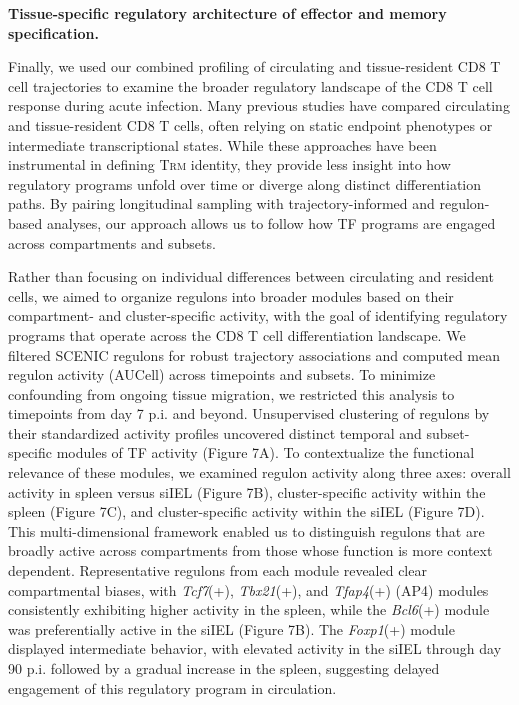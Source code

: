 \textbf{Tissue-specific regulatory architecture of effector and memory
specification.}

Finally, we used our combined profiling of circulating and
tissue-resident CD8 T cell trajectories to examine the broader
regulatory landscape of the CD8 T cell response during acute infection.
Many previous studies have compared circulating and tissue-resident CD8
T cells, often relying on static endpoint phenotypes or intermediate
transcriptional states. While these approaches have been instrumental in
defining T\textsc{rm} identity, they provide less insight into how
regulatory programs unfold over time or diverge along distinct
differentiation paths. By pairing longitudinal sampling with
trajectory-informed and regulon-based analyses, our approach allows us
to follow how TF programs are engaged across compartments and subsets.

Rather than focusing on individual differences between circulating and
resident cells, we aimed to organize regulons into broader modules based
on their compartment- and cluster-specific activity, with the goal of
identifying regulatory programs that operate across the CD8 T cell
differentiation landscape. We filtered SCENIC regulons for robust
trajectory associations and computed mean regulon activity (AUCell)
across timepoints and subsets. To minimize confounding from ongoing
tissue migration, we restricted this analysis to timepoints from day 7
p.i. and beyond. Unsupervised clustering of regulons by their
standardized activity profiles uncovered distinct temporal and
subset-specific modules of TF activity (Figure 7A). To contextualize the
functional relevance of these modules, we examined regulon activity
along three axes: overall activity in spleen versus siIEL (Figure 7B),
cluster-specific activity within the spleen (Figure 7C), and
cluster-specific activity within the siIEL (Figure 7D). This
multi-dimensional framework enabled us to distinguish regulons that are
broadly active across compartments from those whose function is more
context dependent. Representative regulons from each module revealed
clear compartmental biases, with \emph{Tcf7}(+), \emph{Tbx21}(+), and
\emph{Tfap4}(+) (AP4) modules consistently exhibiting higher activity in
the spleen, while the \emph{Bcl6}(+) module was preferentially active in
the siIEL (Figure 7B). The \emph{Foxp1}(+) module displayed intermediate
behavior, with elevated activity in the siIEL through day 90 p.i.
followed by a gradual increase in the spleen, suggesting delayed
engagement of this regulatory program in circulation.

